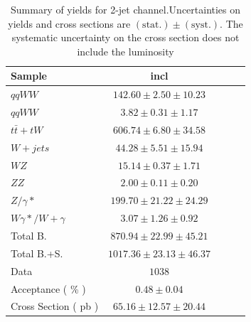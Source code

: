 \begin{table}[!ht]
{\small
\begin{center}
\begin{tabular}{|l|c|c|c|c|}
\hline
Sample  & incl  \\ \hline
$qqWW$  & $142.60 \pm 2.50 \pm 10.23 $  \\
$qqWW$  & $3.82 \pm 0.31 \pm 1.17 $ \\
$t\bar{t} + tW$ & $606.74 \pm 6.80 \pm 34.58 $  \\
$W+jets$    & $44.28 \pm 5.51 \pm 15.94 $   \\
$WZ$    & $15.14 \pm 0.37 \pm 1.71 $    \\
$ZZ$    & $2.00 \pm 0.11 \pm 0.20 $ \\
$Z/\gamma*$ & $199.70 \pm 21.22 \pm 24.29 $ \\
$W\gamma*/W+\gamma$ & $3.07 \pm 1.26 \pm 0.92 $ \\
\hline \hline
Total B.    & $870.94 \pm 22.99 \pm 45.21 $ \\ \hline \hline
Total B.+S. & $1017.36 \pm 23.13 \pm 46.37 $    \\ \hline \hline
Data    & $1038$    \\ \hline \hline
Acceptance ( \% )   & $0.48 \pm 0.04    $\\
Cross Section ( pb )    & $65.16 \pm 12.57 \pm 20.44$   \\ \hline
\end{tabular}
\caption{Summary of yields for 2-jet channel.Uncertainties on yields and cross sections are $\mathrm{(stat.)} \pm \mathrm{(syst.)}$. The systematic uncertainty on the cross section does not include the luminosity}
\label{tab:datayields_wwxsec_2j_incl}
\end{center}}
\end{table}

